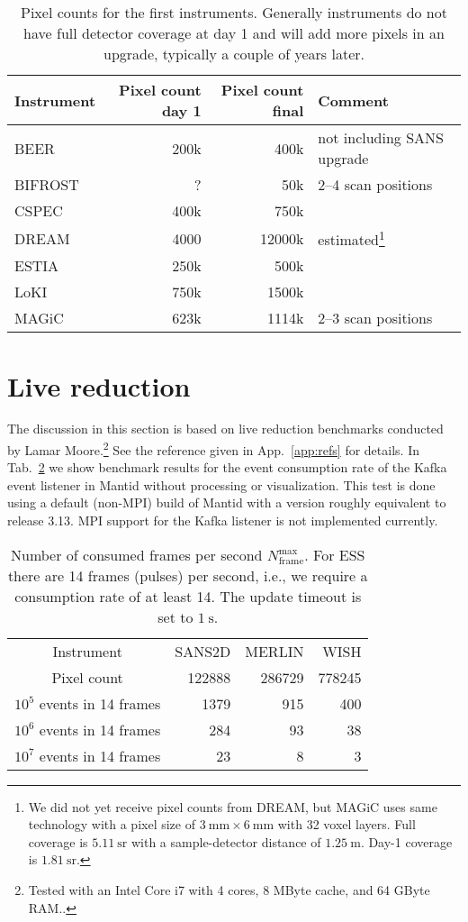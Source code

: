\documentclass[a4paper,english,numbers=noenddot,bibliography=totoc,chapterprefix=on,DIV=12]{scrartcl}
\newcommand{\beer}{BEER\xspace}
\newcommand{\bifrost}{BIFROST\xspace}
\newcommand{\cspec}{CSPEC\xspace}
\newcommand{\dream}{DREAM\xspace}
\newcommand{\estia}{ESTIA\xspace}
\newcommand{\loki}{LoKI\xspace}
\newcommand{\magic}{MAGiC\xspace}
\newcommand{\mantid}{Mantid\xspace}
\begin{document}
\begin{table}
  \centering
  \begin{tabular}{lrrl}
    Instrument & Pixel count day 1 & Pixel count final & Comment\\
    \hline
    \beer & 200k & 400k & not including SANS upgrade\\
    \bifrost & ? & 50k & 2--4 scan positions\\
    \cspec & 400k & 750k \\
    \dream & 4000 & 12000k & estimated\footnote{We did not yet receive pixel counts from \dream, but \magic uses same technology with a pixel size of $3~\mathrm{mm} \times 6~\mathrm{mm}$ with 32 voxel layers. Full coverage is $5.11~\mathrm{sr}$ with a sample-detector distance of $1.25~\mathrm{m}$. Day-1 coverage is $1.81~\mathrm{sr}$.}\\
    \estia & 250k & 500k \\
    \loki & 750k & 1500k \\
    \magic & 623k & 1114k & 2--3 scan positions \\
  \end{tabular}
  \caption{\label{tab:pixel-counts}Pixel counts for the first instruments. Generally instruments do not have full detector coverage at day 1 and will add more pixels in an upgrade, typically a couple of years later.}
\end{table}




\section{Live reduction}

The discussion in this section is based on live reduction benchmarks conducted by Lamar Moore.\footnote{Tested with an Intel Core i7 with 4 cores, 8 MByte cache, and 64 GByte RAM..}
See the reference given in App.~\ref{app:refs} for details.
In Tab.~\ref{tab:consumption-rate} we show benchmark results for the event consumption rate of the Kafka event listener in \mantid without processing or visualization.
This test is done using a default (non-MPI) build of \mantid with a version roughly equivalent to release 3.13.
MPI support for the Kafka listener is not implemented currently.

\begin{table}
  \centering
  \begin{tabular}{c|rrr}
    Instrument & SANS2D & MERLIN & WISH\\
    Pixel count & 122888 & 286729 & 778245\\
    \hline
    $10^5$ events in 14 frames & 1379 & 915 & 400 \\
    $10^6$ events in 14 frames & 284 & 93 & 38 \\
    $10^7$ events in 14 frames & 23 & 8 & 3 \\
  \end{tabular}
  \caption{\label{tab:consumption-rate}Number of consumed frames per second $N_{\text{frame}}^{\text{max}}$. For ESS there are 14 frames (pulses) per second, i.e., we require a consumption rate of at least 14. The update timeout is set to $1~\mathrm{s}$.}
\end{table}
\end{document}
